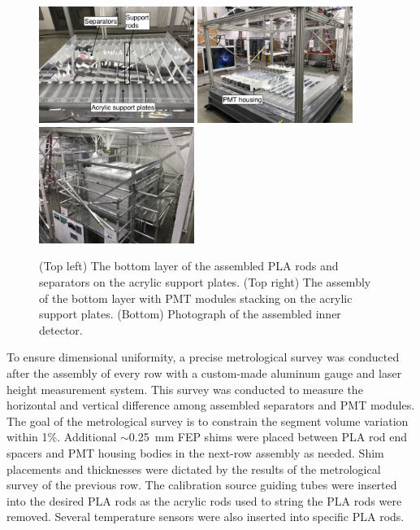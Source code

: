 \begin{figure}[h!]
\centering
\includegraphics[width=0.45\textwidth]{Figures/Firstlayer.jpg}\quad
\includegraphics[width=0.45\textwidth]{Figures/OngoingAssembly.jpg}\\
\includegraphics[width=0.45\textwidth]{Figures/FinishedAssembly.jpg}
\caption[The photograph of the PROSPECT AD assembly]{
(Top left) The bottom layer of the assembled PLA rods and separators on the acrylic support plates.
(Top right) The assembly of the bottom layer with PMT modules stacking on the acrylic support plates. 
(Bottom) Photograph of the assembled inner detector.}
\label{fig:ADAssemble}
\end{figure}

To ensure dimensional uniformity, a precise metrological survey was conducted after the assembly of every row with a custom-made aluminum gauge and laser height measurement system.
This survey was conducted to measure the horizontal and vertical difference among assembled separators and PMT modules.
The goal of the metrological survey is to constrain the segment volume variation within 1\%.
Additional $\sim$0.25~mm FEP shims were placed between PLA rod end spacers and PMT housing bodies in the next-row assembly as needed.  
Shim placements and thicknesses were dictated by the results of the metrological survey of the previous row.  
The calibration source guiding tubes were inserted into the desired PLA rods as the acrylic rods used to string the PLA rods were removed.
Several temperature sensors were also inserted into specific PLA rods.

